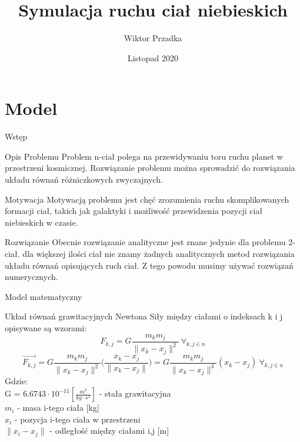 \documentclass{beamer}
\title{Symulacja ruchu ciał niebieskich}
\author{Wiktor Przadka}
\date{Listopad 2020}
\begin{document}
\maketitle

\section{Model}

\begin{frame}{Wstęp}
    \begin{block}{Opis Problemu}
        Problem n-ciał polega na przewidywaniu toru ruchu planet w przestrzeni kosmicznej. Rozwiązanie problemu można sprowadzić do rozwiązania układu równań różniczkowych zwyczajnych.
    \end{block}
    \begin{block}{Motywacja}
        Motywacją problemu jest chęć zrozumienia ruchu skomplikowanych formacji ciał, takich jak galaktyki i możliwość przewidzenia pozycji ciał niebieskich w czasie.
    \end{block}
    \begin{block}{Rozwiązanie}
        Obecnie rozwiązanie analityczne jest znane jedynie dla problemu 2-ciał. dla większej ilości ciał nie znamy żadnych analitycznych metod rozwiązania układu równań opisujących ruch ciał. Z tego powodu musimy używać rozwiązań numerycznych.
    \end{block}
\end{frame}

\begin{frame}{Model matematyczny}
    \begin{block}{Układ równań grawitacyjnych Newtona}
        Siły między ciałami o indeksach k i j opisywane są wzorami:
        $$ F_{k,j} = G \frac{ m_{k} m_{j} }{ \| x_{k} - x_{j} \|^2 }\ \forall_{k, j \in n} $$
        $$ \vec{F_{k,j}} 
        = G \frac{ m_{k} m_{j} }{ \| x_{k} - x_{j} \|^2 } 
        \Big( \frac{ x_{k} - x_{j} }{\| x_{k} - x_{j} \|} \Big) 
        = G \frac{ m_{k} m_{j} }{ \| x_{k} - x_{j} \|^3 }(x_{k} - x_{j})\ \forall_{k, j \in n} $$
        Gdzie:\\
        G = $6.6743\cdot 10^{-11} [\frac{m^3}{kg \cdot s^2}]$ - stała grawitacyjna \\
        $m_{i}$ - masa i-tego ciała [kg]\\
        $x_{i}$ - pozycja i-tego ciała w przestrzeni\\
        $\| x_{i} - x_{j} \|$ - odległość między ciałami i,j [m]\\
    \end{block}
\end{frame}
\end{document}
